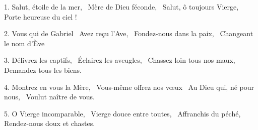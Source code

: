 \noindent
{}
{1. Salut, étoile de la mer,~\newline
Mère de Dieu féconde,~\newline
Salut, ô toujours Vierge,~\newline
Porte heureuse du ciel !}

{2. Vous qui de Gabriel~\newline
Avez reçu l'Ave,~\newline
Fondez-nous dans la paix,~\newline
Changeant le nom d'Ève~}

{3. Délivrez les captifs,~\newline
Éclairez les aveugles,~\newline
Chassez loin tous nos maux,~\newline
Demandez tous les biens.}

{4. Montrez en vous la Mère,~\newline
Vous-même offrez nos v{\oe}ux~\newline
Au Dieu qui, né pour nous,~\newline
Voulut naître de vous.}

{5. O Vierge incomparable,~\newline
Vierge douce entre toutes,~\newline
Affranchis du péché,~\newline
Rendez-nous doux et chastes.}

